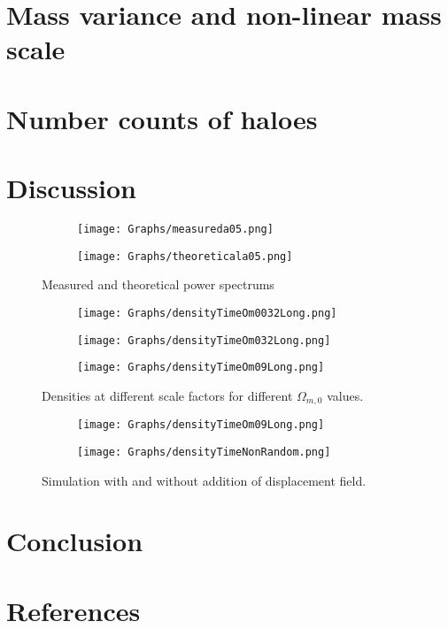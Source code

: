 \documentclass[12pt]{article}
\begin{document}
\section{Mass variance and non-linear mass scale}



\section{Number counts of haloes}



\section{Discussion}


\begin{figure}[htp]
	\centering
	\begin{subfigure}[b]{0.49\textwidth}
		\centering
		\texttt{[image: Graphs/measureda05.png]}
	\end{subfigure}
	\hfill
	\begin{subfigure}[b]{0.49\textwidth}
		\centering
		\texttt{[image: Graphs/theoreticala05.png]}
	\end{subfigure}
	\caption{Measured and theoretical power spectrums}
	\label{fig:spectrum05}
\end{figure}

\begin{figure}[htp]
	\centering
	\begin{subfigure}[b]{0.49\textwidth}
		\centering
		\texttt{[image: Graphs/densityTimeOm0032Long.png]}
	\end{subfigure}
	\hfill
	\begin{subfigure}[b]{0.49\textwidth}
		\centering
		\texttt{[image: Graphs/densityTimeOm032Long.png]}
	\end{subfigure}
	\begin{subfigure}[b]{0.49\textwidth}
		\centering
		\texttt{[image: Graphs/densityTimeOm09Long.png]}
	\end{subfigure}
	\caption{Densities at different scale factors for different $\Omega_{m, 0}$ values.}
	\label{fig:densities}
\end{figure}

\begin{figure}[htp]
	\centering
	\begin{subfigure}[b]{0.49\textwidth}
		\centering
		\texttt{[image: Graphs/densityTimeOm09Long.png]}
	\end{subfigure}
	\hfill
	\begin{subfigure}[b]{0.49\textwidth}
		\centering
		\texttt{[image: Graphs/densityTimeNonRandom.png]}
	\end{subfigure}
	\caption{Simulation with and without addition of displacement field.}
	\label{fig:randomField}
\end{figure}



\section*{Conclusion}



\section*{References}
\printbibliography[heading=none]
\end{document}
